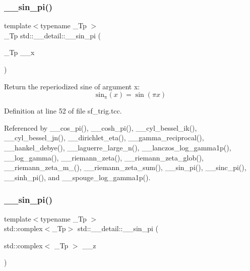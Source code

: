 \mbox{\label{namespacestd_1_1____detail_a763249defff6377195818c2fc6e7bca2}} 
\subsubsection{\texorpdfstring{\+\_\+\+\_\+sin\+\_\+pi()}{\_\_sin\_pi()}\hspace{0.1cm}{\footnotesize\ttfamily [1/2]}}
{\footnotesize\ttfamily template$<$typename \+\_\+\+Tp $>$ \\
\+\_\+\+Tp std\+::\+\_\+\+\_\+detail\+::\+\_\+\+\_\+sin\+\_\+pi (\begin{DoxyParamCaption}\item[{\+\_\+\+Tp}]{\+\_\+\+\_\+x }\end{DoxyParamCaption})}

Return the reperiodized sine of argument x\+: \[ \mathrm{sin_\pi}(x) = \sin(\pi x) \] 

Definition at line 52 of file sf\+\_\+trig.\+tcc.



Referenced by \+\_\+\+\_\+cos\+\_\+pi(), \+\_\+\+\_\+cosh\+\_\+pi(), \+\_\+\+\_\+cyl\+\_\+bessel\+\_\+ik(), \+\_\+\+\_\+cyl\+\_\+bessel\+\_\+jn(), \+\_\+\+\_\+dirichlet\+\_\+eta(), \+\_\+\+\_\+gamma\+\_\+reciprocal(), \+\_\+\+\_\+hankel\+\_\+debye(), \+\_\+\+\_\+laguerre\+\_\+large\+\_\+n(), \+\_\+\+\_\+lanczos\+\_\+log\+\_\+gamma1p(), \+\_\+\+\_\+log\+\_\+gamma(), \+\_\+\+\_\+riemann\+\_\+zeta(), \+\_\+\+\_\+riemann\+\_\+zeta\+\_\+glob(), \+\_\+\+\_\+riemann\+\_\+zeta\+\_\+m\+\_(), \+\_\+\+\_\+riemann\+\_\+zeta\+\_\+sum(), \+\_\+\+\_\+sin\+\_\+pi(), \+\_\+\+\_\+sinc\+\_\+pi(), \+\_\+\+\_\+sinh\+\_\+pi(), and \+\_\+\+\_\+spouge\+\_\+log\+\_\+gamma1p().

\mbox{\label{namespacestd_1_1____detail_a5f26e85b3d646e5c69be173baebd4185}} 
\subsubsection{\texorpdfstring{\+\_\+\+\_\+sin\+\_\+pi()}{\_\_sin\_pi()}\hspace{0.1cm}{\footnotesize\ttfamily [2/2]}}
{\footnotesize\ttfamily template$<$typename \+\_\+\+Tp $>$ \\
std\+::complex$<$\+\_\+\+Tp$>$ std\+::\+\_\+\+\_\+detail\+::\+\_\+\+\_\+sin\+\_\+pi (\begin{DoxyParamCaption}\item[{std\+::complex$<$ \+\_\+\+Tp $>$}]{\+\_\+\+\_\+z }\end{DoxyParamCaption})}

